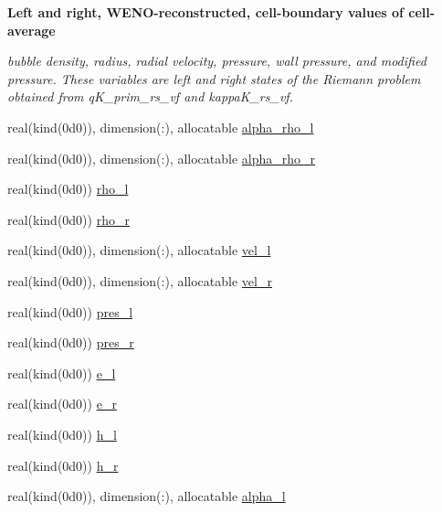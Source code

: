 \begin{Indent}\textbf{ Left and right, W\+E\+N\+O-\/reconstructed, cell-\/boundary values of cell-\/average}\par
{\em bubble density, radius, radial velocity, pressure, wall pressure, and modified pressure. These variables are left and right states of the Riemann problem obtained from q\+K\+\_\+prim\+\_\+rs\+\_\+vf and kappa\+K\+\_\+rs\+\_\+vf. }\begin{DoxyCompactItemize}
\item 
real(kind(0d0)), dimension(\+:), allocatable \hyperlink{namespacem__riemann__solvers_acfbe99c9151b71dadc19e80851d33bfe}{alpha\+\_\+rho\+\_\+l}
\item 
real(kind(0d0)), dimension(\+:), allocatable \hyperlink{namespacem__riemann__solvers_a2d815c8ccf9b96727876621c46f3da00}{alpha\+\_\+rho\+\_\+r}
\item 
real(kind(0d0)) \hyperlink{namespacem__riemann__solvers_afc9d9cb504eca33ca970f4340c259161}{rho\+\_\+l}
\item 
real(kind(0d0)) \hyperlink{namespacem__riemann__solvers_a03542f2527def3010f55cd456ccca698}{rho\+\_\+r}
\item 
real(kind(0d0)), dimension(\+:), allocatable \hyperlink{namespacem__riemann__solvers_ab17d29f1de63b4669165d7d92f209986}{vel\+\_\+l}
\item 
real(kind(0d0)), dimension(\+:), allocatable \hyperlink{namespacem__riemann__solvers_a27a761fd83f4f8f7178b8c57b09b825e}{vel\+\_\+r}
\item 
real(kind(0d0)) \hyperlink{namespacem__riemann__solvers_a81973da2ed5f2e08dd363d889c0e21d7}{pres\+\_\+l}
\item 
real(kind(0d0)) \hyperlink{namespacem__riemann__solvers_abe054616c664c4f090dfff5ba0aa679d}{pres\+\_\+r}
\item 
real(kind(0d0)) \hyperlink{namespacem__riemann__solvers_a44eda4124cd70f22697144d295b47009}{e\+\_\+l}
\item 
real(kind(0d0)) \hyperlink{namespacem__riemann__solvers_a5c08b40ab939ec42b3eb2f50f41a045d}{e\+\_\+r}
\item 
real(kind(0d0)) \hyperlink{namespacem__riemann__solvers_a075a895b8ab81335f21a168603f29f37}{h\+\_\+l}
\item 
real(kind(0d0)) \hyperlink{namespacem__riemann__solvers_ac585ca9198161cf6d9130b696a2f1196}{h\+\_\+r}
\item 
real(kind(0d0)), dimension(\+:), allocatable \hyperlink{namespacem__riemann__solvers_a485dc456f00eaa35c862ca3a2daa3d8c}{alpha\+\_\+l}

\end{DoxyCompactItemize}
\end{Indent}
